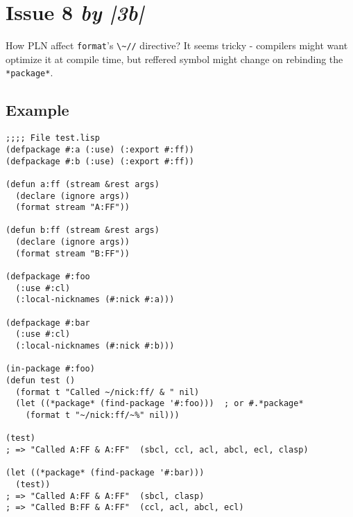 \documentclass[11pt]{article}
\author{Grolter Bell}
\date{\today}
\title{}
\begin{document}
\section{Issue 8 \emph{by |3b|}}
\label{sec:org219361f}
How PLN affect \texttt{format}'s \texttt{\textbackslash{}\textasciitilde{}//} directive? It seems tricky - compilers might
want optimize it at compile time, but reffered symbol might change on
rebinding the \texttt{*package*}.
\subsection{Example}
\label{sec:org9872ecf}
\begin{verbatim}
;;;; File test.lisp
(defpackage #:a (:use) (:export #:ff))
(defpackage #:b (:use) (:export #:ff))

(defun a:ff (stream &rest args)
  (declare (ignore args))
  (format stream "A:FF"))

(defun b:ff (stream &rest args)
  (declare (ignore args))
  (format stream "B:FF"))

(defpackage #:foo
  (:use #:cl)
  (:local-nicknames (#:nick #:a)))

(defpackage #:bar
  (:use #:cl)
  (:local-nicknames (#:nick #:b)))

(in-package #:foo)
(defun test ()
  (format t "Called ~/nick:ff/ & " nil)
  (let ((*package* (find-package '#:foo)))  ; or #.*package*
    (format t "~/nick:ff/~%" nil)))

(test)
; => "Called A:FF & A:FF"  (sbcl, ccl, acl, abcl, ecl, clasp)

(let ((*package* (find-package '#:bar)))
  (test))
; => "Called A:FF & A:FF"  (sbcl, clasp)
; => "Called B:FF & A:FF"  (ccl, acl, abcl, ecl)
\end{verbatim}
\end{document}
